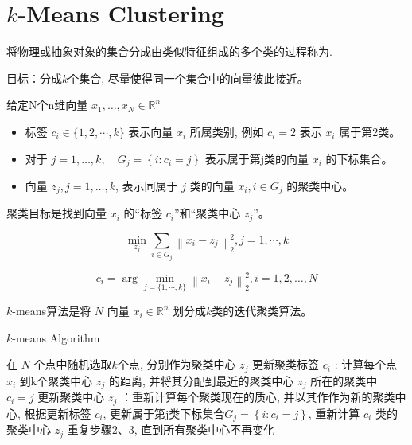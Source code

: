 \section{$k$-Means Clustering}

将物理或抽象对象的集合分成由类似特征组成的多个类的过程称为.



目标：分成$k$个集合, 尽量使得同一个集合中的向量彼此接近。 

\begin{notation}
    给定N个n维向量 $ x_{1}, \ldots, x_{N} \in \mathbb{R}^{n} $

    \begin{itemize}
        \item 标签 $ c_{i} \in\{1,2, \cdots, k\} $ 表示向量 $ x_{i} $ 所属类别, 例如 $ c_{i}=2 $ 表示 $ x_{i} $ 属于第2类。 
        \item 对于 $ j=1, \ldots, k, \quad G_{j}=\left\{i: c_{i}=j\right\} $ 表示属于第j类的向量 $ x_{i} $ 的下标集合。 
        \item 向量 $ z_{j}, j=1, \ldots, k $, 表示同属于 $ j $ 类的向量 $ x_{i}, i \in G_{j} $ 的聚类中心。 
    \end{itemize}
\end{notation}

聚类目标是找到向量 $ x_{i} $ 的“标签 $ c_{i} $”和“聚类中心 $ z_{j} $”。

\begin{problem}
    $$ \min _{z_{j}} \sum_{i \in G_{j}}\left\|x_{i}-z_{j}\right\|_{2}^{2}, j=1, \cdots, k $$

    $$ c_{i}=
    \arg \min_{j=\{1, \cdots, k\}} \left\|x_{i}-z_{j}\right\|_{2}^{2}, i=1,2, \ldots, N $$

    
\end{problem}

$k$-means算法是将 $ {N} $ 向量 $ x_{i} \in \mathbb{R}^{n} $ 划分成$k$类的迭代聚类算法。 

\begin{algorithm}
    \caption{$k$-means Algorithm}
    在 $ {N} $ 个点中随机选取$k$个点, 分别作为聚类中心 $ z_{j} $\;
    更新聚类标签 $ c_{i} $ : 计算每个点 $ x_{i} $ 到k个聚类中心 $ z_{j} $ 的距离, 并将其分配到最近的聚类中心 $ z_{j} $ 所在的聚类中 $ c_{i}=j $\;
    更新聚类中心 $ z_{j} $ ：重新计算每个聚类现在的质心, 并以其作作为新的聚类中心, 根据更新标签 $ c_{i} $, 更新属于第j类下标集合$ G_{j}=\left\{i: c_{i}=j\right\} $, 重新计算 $ c_{i} $ 类的聚类中心 $ z_{j} $\;
    重复步骤2、3, 直到所有聚类中心不再变化
\end{algorithm}

